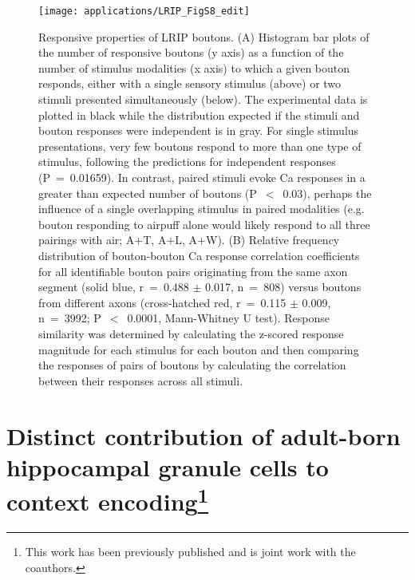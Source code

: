 \begin{figure}
{	%
	}
	\label{fig:other:LRIP:imaging}
\end{figure}

\begin{figure}
	\centering
	\texttt{[image: applications/LRIP\_FigS8\_edit]}
	\caption[Responsive properties of LRIP boutons]{Responsive properties of LRIP boutons. (A) Histogram bar plots of the number of responsive boutons (y axis) as a function of the number of stimulus modalities (x axis) to which a given bouton responds, either with a single sensory stimulus (above) or two stimuli presented simultaneously (below). The experimental data is plotted in black while the distribution expected if the stimuli and bouton responses were independent is in gray. For single stimulus presentations, very few boutons respond to more than one type of stimulus, following the predictions for independent responses (P~=~0.01659). In contrast, paired stimuli evoke Ca responses in a greater than expected number of boutons (P~$<$~0.03), perhaps the influence of a single overlapping stimulus in paired modalities (e.g. bouton responding to airpuff alone would likely respond to all three pairings with air; A+T, A+L, A+W).
	(B) Relative frequency distribution of bouton-bouton Ca response correlation coefficients for all identifiable bouton pairs originating from the same axon segment (solid blue, r~=~0.488 $\pm$ 0.017, n~=~808) versus boutons from different axons (cross-hatched red, r~=~0.115 $\pm$ 0.009, n~=~3992; P~$<$~0.0001, Mann-Whitney U test). Response similarity was determined by calculating the z-scored response magnitude for each stimulus for each bouton and then comparing the responses of pairs of boutons by calculating the correlation between their responses across all stimuli.
	}
	\label{fig:other:LRIP:boutons}
\end{figure}

\section[Distinct contribution of adult-born hippocampal granule cells to context encoding]{Distinct contribution of adult-born hippocampal granule cells to context encoding\footnote{This work has been previously published \citep{Danielson2016a} and is joint work with the coauthors.}}

